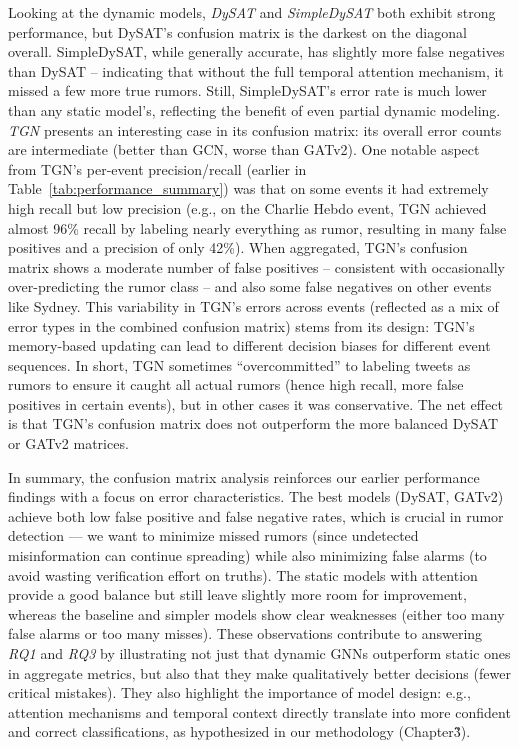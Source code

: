 \documentclass{cshonours}
\begin{document}
Looking at the dynamic models, \emph{DySAT} and \emph{SimpleDySAT} both exhibit strong performance, but DySAT's confusion matrix is the darkest on the diagonal overall. SimpleDySAT, while generally accurate, has slightly more false negatives than DySAT – indicating that without the full temporal attention mechanism, it missed a few more true rumors. Still, SimpleDySAT's error rate is much lower than any static model's, reflecting the benefit of even partial dynamic modeling. \emph{TGN} presents an interesting case in its confusion matrix: its overall error counts are intermediate (better than GCN, worse than GATv2). One notable aspect from TGN's per-event precision/recall (earlier in Table~\ref{tab:performance_summary}) was that on some events it had extremely high recall but low precision (e.g., on the Charlie Hebdo event, TGN achieved almost 96\% recall by labeling nearly everything as rumor, resulting in many false positives and a precision of only 42\%). When aggregated, TGN's confusion matrix shows a moderate number of false positives – consistent with occasionally over-predicting the rumor class – and also some false negatives on other events like Sydney. This variability in TGN's errors across events (reflected as a mix of error types in the combined confusion matrix) stems from its design: TGN's memory-based updating can lead to different decision biases for different event sequences. In short, TGN sometimes ``overcommitted'' to labeling tweets as rumors to ensure it caught all actual rumors (hence high recall, more false positives in certain events), but in other cases it was conservative. The net effect is that TGN's confusion matrix does not outperform the more balanced DySAT or GATv2 matrices.

In summary, the confusion matrix analysis reinforces our earlier performance findings with a focus on error characteristics. The best models (DySAT, GATv2) achieve both low false positive and false negative rates, which is crucial in rumor detection — we want to minimize missed rumors (since undetected misinformation can continue spreading) while also minimizing false alarms (to avoid wasting verification effort on truths). The static models with attention provide a good balance but still leave slightly more room for improvement, whereas the baseline and simpler models show clear weaknesses (either too many false alarms or too many misses). These observations contribute to answering \emph{RQ1} and \emph{RQ3} by illustrating not just that dynamic GNNs outperform static ones in aggregate metrics, but also that they make qualitatively better decisions (fewer critical mistakes). They also highlight the importance of model design: e.g., attention mechanisms and temporal context directly translate into more confident and correct classifications, as hypothesized in our methodology (Chapter\~3).
\end{document}

